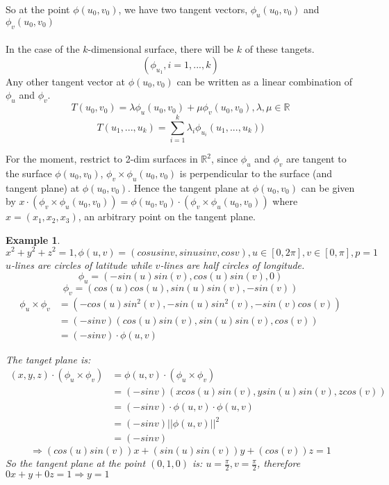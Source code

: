 \documentclass[12pt]{article}
\theoremstyle{plain}
\newtheorem{example}[theorem]{Example}
\theoremstyle{definition}
\begin{document}
So at the point $\phi (u_0, v_0)$, we have two tangent vectors, $\phi_u (u_0, v_0)$ and $\phi_v (u_0, v_0)$\\
\\
In the case of the $k$-dimensional surface, there will be $k$ of these tangets. $$(\phi_{u_1}, i = 1,...,k)$$
Any other tangent vector at $\phi (u_0, v_0)$ can be written as a linear combination of $\phi_u$ and $\phi_v$.
$$T(u_0, v_0) = \lambda \phi_u (u_0, v_0) + \mu \phi_v (u_0, v_0), \lambda, \mu \in \mathbb{R}$$
$$T(u_1, ..., u_k) = \sum^k_{i=1} \lambda_i \phi_{u_i} (u_1, ..., u_k))$$

For the moment, restrict to 2-dim surfaces in $\mathbb{R}^2$, since $\phi_u$ and $\phi_v$ are tangent to the surface $\phi (u_0, v_0)$, $\phi_v \times \phi_u (u_0, v_0)$ is perpendicular to the surface (and tangent plane) at $\phi (u_0, v_0)$. Hence the tangent plane at $\phi (u_0, v_0)$ can be given by $x\cdot (\phi_v \times \phi_u (u_0, v_0)) = \phi (u_0, v_0) \cdot (\phi_v \times \phi_u (u_0, v_0))$ where $x=(x_1, x_2, x_3)$, an arbitrary point on the tangent plane.

\begin{example}
	$x^2 + y^2 + z^2 = 1, \phi (u,v) = (cosu sinv, sinu sinv, cosv), u\in [0,2\pi], v\in [0,\pi], p=1$\\
	$u$-lines are circles of latitude while $v$-lines are half circles of longitude.\\
	$$\phi_u = (-sin(u)sin(v), cos(u)sin(v), 0)$$
	$$\phi_v = (cos(u)cos(u), sin(u)sin(v), -sin(v))$$
	\begin{align*}
		\phi_u \times \phi_v &= (-cos(u)sin^2(v), -sin(u)sin^2 (v), -sin(v)cos(v))\\
		&= (-sinv)(cos(u)sin(v), sin(u)sin(v), cos(v))\\
		&= (-sinv)\cdot \phi (u,v)
	\end{align*}

	The tanget plane is:
	\begin{align*}
		(x,y,z)\cdot (\phi_u \times \phi_v) &= \phi (u,v) \cdot (\phi_u \times \phi_v)\\
		&= (-sinv)(xcos(u)sin(v), ysin(u)sin(v), zcos(v))\\
		&= (-sinv) \cdot  \phi (u,v) \cdot  \phi (u,v)\\
		&= (-sinv) || \phi (u,v) ||^2\\
		&= (-sinv)
	\end{align*}
	$$\Longrightarrow (cos(u)sin(v))x + (sin(u)sin(v))y + (cos(v))z = 1$$
	So the tangent plane at the point $(0,1,0)$ is:
	$u=\frac{\pi}{2}, v=\frac{\pi}{2}$, therefore $0x + y + 0z = 1 \Longrightarrow y=1$

\end{example}
\end{document}
